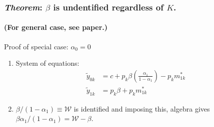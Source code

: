 \documentclass{beamer}
\begin{document}
%
%
%
%
\begin{frame}
  \frametitle{\emph{Theorem}: $\beta$ is undentified regardless of $K$.}
  \framesubtitle{(For general case, see paper.)}
  \begin{block}{Proof of special case: $\alpha_0 = 0$ }
    \begin{enumerate}
      \item System of equations: 
    \vspace{0.5em}
\begin{align*}
  \widetilde{y}_{0k} &=c + p_k \beta \left(\frac{\alpha_1}{1 -  \alpha_1}\right) - p _k m_{1k}^* \\
  \widetilde{y}_{1k} &=p_k \beta + p _k m_{1k}^*
\end{align*}
  \item $\beta/(1-\alpha_1) \equiv \mathcal{W}$ is identified and imposing this, algebra gives $\beta\alpha_1/(1-\alpha_1) = \mathcal{W} - \beta$. 

    \end{enumerate}
  \end{block} 
    
\end{frame}
\end{document}

